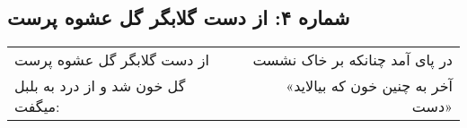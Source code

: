 \begin{center}
\section*{شماره ۴: از دست گلابگر گل عشوه پرست}
\label{sec:004}
\begin{longtable}{l p{0.5cm} r}
از دست گلابگر گل عشوه پرست
&&
در پای آمد چنانکه بر خاک نشست
\\
گل خون شد و از درد به بلبل میگفت:
&&
«آخر به چنین خون که بیالاید دست»
\\
\end{longtable}
\end{center}
